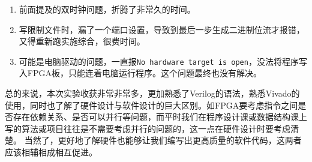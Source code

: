 \documentclass[12pt,UTF8]{ctexart}
\begin{document}
\begin{spacing}{1.1}
\begin{enumerate}
    \item 前面提及的双时钟问题，折腾了非常久的时间。
    \item 写限制文件时，漏了一个端口设置，导致到最后一步生成二进制位流才报错，又得重新跑实施综合，很费时间。
    \item 可能是电脑驱动的问题，一直报\verb'No hardware target is open'，没法将程序写入FPGA板，只能连着电脑运行程序。这个问题最终也没有解决。
\end{enumerate}
\par 总的来说，本次实验收获非常非常多，更加熟悉了Verilog的语法，熟悉Vivado的使用，同时也了解了硬件设计与软件设计的巨大区别。如FPGA要考虑指令之间是否存在依赖关系、是否可以并行等问题，而平时我们在程序设计课或数据结构课上写的算法或项目往往是不需要考虑并行的问题的，这一点在硬件设计时要考虑清楚。
当然了，更好地了解硬件也能够让我们编写出更高质量的软件代码，这两者应该相辅相成相互促进。



\end{spacing}
\end{document}
